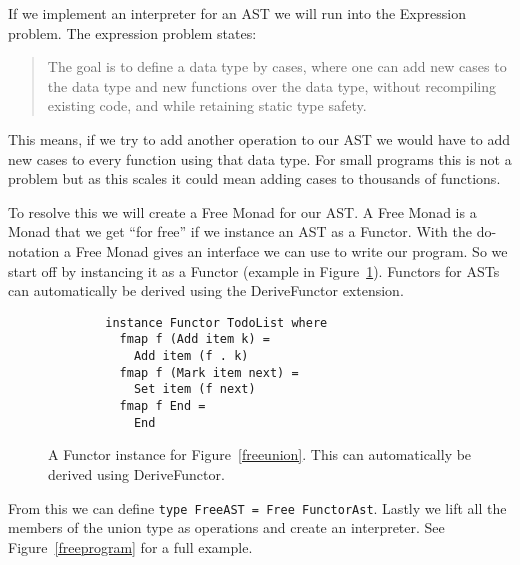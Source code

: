 \documentclass[12pt]{report}
\theoremstyle{definition}
\theoremstyle{theorem}
\begin{document}

If we implement an interpreter for an AST we will run into the Expression
problem. The expression problem states:

\blockquote{The goal is to define a data type by cases, where one can add new
cases to the data type and new functions over the data type, without recompiling
existing code, and while retaining static type safety.}

This means, if we try to add another operation to our AST we would have to add
new cases to every function using that data type. For small programs this is not
a problem but as this scales it could mean adding cases to thousands of
functions. 

To resolve this we will create a Free Monad for our AST. A Free Monad is a Monad
that we get ``for free'' if we instance an AST as a Functor. With the
do-notation a Free Monad gives an interface we can use to write our program. So
we start off by instancing it as a Functor (example in
Figure~\ref{freefunctor}). Functors for ASTs can automatically be derived using
the DeriveFunctor extension.~\cite{commentarycompiler}

\begin{figure}[H]
    \begin{lstlisting}
        instance Functor TodoList where
          fmap f (Add item k) = 
            Add item (f . k)
          fmap f (Mark item next) = 
            Set item (f next)
          fmap f End = 
            End
    \end{lstlisting}
    \label{freefunctor}
    \caption{A Functor instance for Figure~\ref{freeunion}. This can
    automatically be derived using DeriveFunctor.}
\end{figure}

From this we can define \texttt{type FreeAST = Free FunctorAst}. Lastly we lift
all the members of the union type as operations and create an interpreter. See
Figure~\ref{freeprogram} for a full example.
\end{document}
